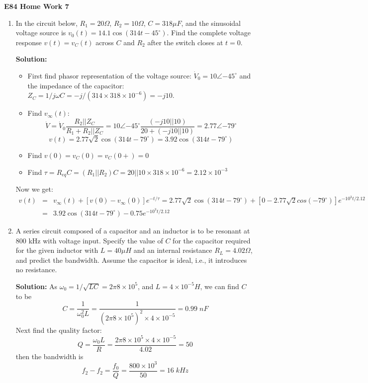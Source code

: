 \usepackage{html}

\begin{center}
{\Large \bf E84 Home Work 7}
\end{center}
\begin{enumerate}

\item In the circuit below, $R_1=20\Omega$, $R_2=10\Omega$, $C=318\mu F$,
and the sinusoidal voltage source is $v_0(t)=14.1 \cos(314 t-45^{\circ})$.
Find the complete voltage response $v(t)=v_C(t)$ across $C$ and $R_2$ after
the switch closes at $t=0$.


{\bf Solution:} 
\begin{itemize}
\item First find phasor representation of the voltage source:
$\dot{V}_0=10\angle{-45^{\circ}}$ and the impedance of the capacitor:
$Z_C=1/j\omega C=-j/(314\times 318\times 10^{-6})=-j10$. 

\item Find $v_\infty(t)$:
  \[ \dot{V}=\dot{V}_0 \frac{R_2|| Z_C}{R_1+R_2||Z_C}
  =10\angle{-45^\circ}\frac{(-j10 || 10)}{20+(-j10 || 10)}
  =2.77\angle{-79^\circ} \]
  \[ v(t)=2.77\sqrt{2} \cos(314 t-79^\circ)=3.92 \cos(314 t-79^\circ) \]
\item Find $v(0)=v_C(0)=v_C(0+)=0$

\item Find $\tau=R_{eq}C=(R_1||R_2) C=20 || 10 \times 318\times 
  10^{-6}=2.12\times 10^{-3}$
\end{itemize}
Now we get:
\begin{eqnarray}
 v(t)&=&v_\infty(t)+[v(0)-v_\infty(0)]e^{-t/\tau}
  =2.77\sqrt{2} \cos(314 t-79^\circ)+[0-2.77\sqrt{2}cos(-79^\circ)] e^{-10^3 t/2.12}
  \nonumber \\ 
  &=& 3.92 \cos(314 t-79^\circ)-0.75 e^{-10^3 t/2.12}
  \nonumber
\end{eqnarray}


\item A series circuit composed of a capacitor and an inductor is to be 
resonant at 800 kHz with voltage input. Specify the value of $C$ for the 
capacitor required for the given inductor with $L=40\mu H$ and an internal 
resistance $R_L=4.02\Omega$, and predict the bandwidth. Assume the capacitor 
is ideal, i.e., it introduces no resistance.


{\bf Solution:}
 As $\omega_0=1/\sqrt{LC}=2\pi 8\times 10^5$, and $L=4\times 10^{-5}H$, we
 can find $C$ to be
 \[
 C=\frac{1}{\omega_0^2 L}=\frac{1}{(2\pi 8\times 10^5)^2\times 4\times 10^{-5}}
 =0.99\;nF	\]
 Next find the quality factor:
 \[
 Q=\frac{\omega_0L}{R}=\frac{2\pi 8\times 10^5\times 4\times 10^{-5}}{4.02}=50
 \]
 then the bandwidth is
 \[	f_2-f_2=\frac{f_0}{Q}=\frac{800\times 10^3}{50}=16\;kHz	\]


\end{enumerate}
